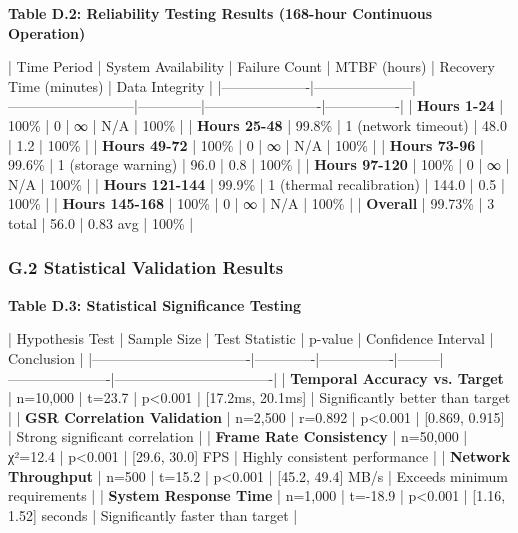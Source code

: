 \documentclass[12pt,a4paper]{article}
\begin{document}
\textbf{Table D.2: Reliability Testing Results (168-hour Continuous Operation)}

| Time Period       | System Availability | Failure Count             | MTBF (hours) | Recovery Time (minutes) | Data Integrity |
|-------------------|---------------------|---------------------------|--------------|-------------------------|----------------|
| \textbf{Hours 1-24}    | 100\%                | 0                         | ∞            | N/A                     | 100\%           |
| \textbf{Hours 25-48}   | 99.8\%               | 1 (network timeout)       | 48.0         | 1.2                     | 100\%           |
| \textbf{Hours 49-72}   | 100\%                | 0                         | ∞            | N/A                     | 100\%           |
| \textbf{Hours 73-96}   | 99.6\%               | 1 (storage warning)       | 96.0         | 0.8                     | 100\%           |
| \textbf{Hours 97-120}  | 100\%                | 0                         | ∞            | N/A                     | 100\%           |
| \textbf{Hours 121-144} | 99.9\%               | 1 (thermal recalibration) | 144.0        | 0.5                     | 100\%           |
| \textbf{Hours 145-168} | 100\%                | 0                         | ∞            | N/A                     | 100\%           |
| \textbf{Overall}       | 99.73\%              | 3 total                   | 56.0         | 0.83 avg                | 100\%           |

\subsubsection{G.2 Statistical Validation Results}

\textbf{Table D.3: Statistical Significance Testing}

| Hypothesis Test                  | Sample Size | Test Statistic | p-value | Confidence Interval  | Conclusion                       |
|----------------------------------|-------------|----------------|---------|----------------------|----------------------------------|
| \textbf{Temporal Accuracy vs. Target} | n=10,000    | t=23.7         | p<0.001 | [17.2ms, 20.1ms]     | Significantly better than target |
| \textbf{GSR Correlation Validation}   | n=2,500     | r=0.892        | p<0.001 | [0.869, 0.915]       | Strong significant correlation   |
| \textbf{Frame Rate Consistency}       | n=50,000    | χ²=12.4        | p<0.001 | [29.6, 30.0] FPS     | Highly consistent performance    |
| \textbf{Network Throughput}           | n=500       | t=15.2         | p<0.001 | [45.2, 49.4] MB/s    | Exceeds minimum requirements     |
| \textbf{System Response Time}         | n=1,000     | t=-18.9        | p<0.001 | [1.16, 1.52] seconds | Significantly faster than target |
\end{document}
